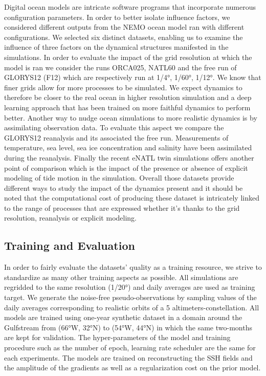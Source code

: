 \documentclass[draft]{agujournal2019}
\begin{document}
Digital ocean models are intricate software programs that incorporate numerous configuration parameters. In order to better isolate influence factors, we considered different outputs from the NEMO ocean model ran with different configurations. We selected six distinct datasets, enabling us to examine the influence of three factors on the dynamical structures manifested in the simulations.
In order to evaluate the impact of the grid resolution at which the model is ran we consider the runs ORCA025, NATL60 and the free run of GLORYS12 (F12) which are respectively run at 1/4°, 1/60°, 1/12°. We know that finer grids allow for more processes to be simulated. We expect dynamics to therefore be closer to the real ocean in higher resolution simulation and a deep learning approach that has been trained on more faithful dynamics to perform better.
Another way to nudge ocean simulations to more realistic dynamics is by assimilating observation data. To evaluate this aspect we compare the GLORYS12 reanalysis and its associated the free run. Measurements of temperature, sea level, sea ice concentration and salinity have been assimilated during the reanalysis.
Finally the recent eNATL twin simulations offers another point of comparison which is the impact of the presence or absence of explicit modeling of tide motion in the simulation.
Overall those datasets provide different ways to study the impact of the dynamics present and it should be noted that the computational cost of producing these dataset is intricately linked to the range of processes that are expressed whether it's thanks to the grid resolution, reanalysis or explicit modeling.


\subsection{Training and Evaluation}
\label{ssec:training}
In order to fairly evaluate the datasets' quality as a training resource, we strive to standardize as many other training aspects as possible.
All simulations are regridded to the same resolution (1/20°) and daily averages are used as training target. We generate the noise-free pseudo-observations by sampling values of the daily averages corresponding to realistic orbits of a 5 altimeters-constellation. All models are trained using one-year synthetic dataset in a domain around the Gulfstream from (66°W, 32°N) to (54°W, 44°N) in which the same two-months are kept for validation. The hyper-parameters of the model and training procedure such as the number of epoch, learning rate scheduler are the same for each experiments. The models are trained on reconstructing the SSH fields and the amplitude of the gradients as well as a regularization cost on the prior model.
\end{document}
